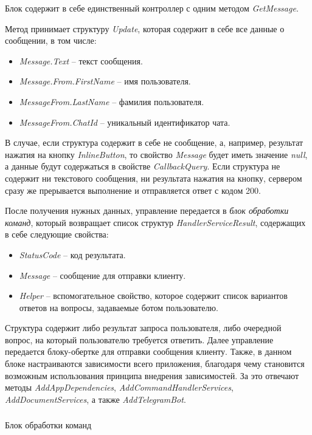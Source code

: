 Блок содержит в себе единственный контроллер с одним методом \emph{GetMessage}.

Метод принимает структуру \emph{Update}, которая содержит в себе все данные о сообщении, в том числе:

\begin{itemize}
	\item \emph{Message.Text} – текст сообщения.
	\item \emph{Message.From.FirstName} – имя пользователя.
	\item \emph{MessageFrom.LastName} – фамилия пользователя.
	\item \emph{MessageFrom.ChatId} – уникальный идентификатор чата.
\end{itemize}

В случае, если структура содержит в себе не сообщение, а, например, результат нажатия на кнопку \emph{InlineButton}, то свойство \emph{Message} будет иметь значение \emph{null}, а данные будут содержаться в свойстве \emph{CallbackQuery}.
Если структура не содержит ни текстового сообщения, ни результата нажатия на кнопку, сервером сразу же прерывается выполнение и отправляется ответ с кодом 200.

После получения нужных данных, управление передается в \emph{блок обработки команд}, который возвращает список структур \emph{HandlerServiceResult}, содержащих в себе следующие свойства:

\begin{itemize}
	\item \emph{StatusCode} – код результата.
	\item \emph{Message} – сообщение для отправки клиенту.
	\item \emph{Helper} – вспомогательное свойство, которое содержит список
вариантов ответов на вопросы, задаваемые ботом пользователю.
\end{itemize}

Структура содержит либо результат запроса пользователя, либо очередной вопрос, на который пользователю требуется ответить.
Далее управление передается блоку-обертке для отправки сообщения клиенту.
Также, в данном блоке настраиваются зависимости всего приложения, благодаря чему становится возможным использования принципа внедрения зависимостей. За это отвечают методы \emph{AddAppDependencies}, \emph{AddCommandHandler\linebreak Services}, \emph{AddDocumentServices}, а также \emph{AddTelegramBot}.

\subsubsection{} Блок обработки команд
\label{sec:design:server:framework}


